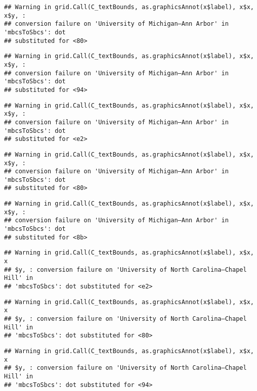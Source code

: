 \documentclass[]{article}
\begin{document}
\begin{verbatim}
## Warning in grid.Call(C_textBounds, as.graphicsAnnot(x$label), x$x, x$y, :
## conversion failure on 'University of Michigan—​Ann Arbor' in 'mbcsToSbcs': dot
## substituted for <80>
\end{verbatim}

\begin{verbatim}
## Warning in grid.Call(C_textBounds, as.graphicsAnnot(x$label), x$x, x$y, :
## conversion failure on 'University of Michigan—​Ann Arbor' in 'mbcsToSbcs': dot
## substituted for <94>
\end{verbatim}

\begin{verbatim}
## Warning in grid.Call(C_textBounds, as.graphicsAnnot(x$label), x$x, x$y, :
## conversion failure on 'University of Michigan—​Ann Arbor' in 'mbcsToSbcs': dot
## substituted for <e2>
\end{verbatim}

\begin{verbatim}
## Warning in grid.Call(C_textBounds, as.graphicsAnnot(x$label), x$x, x$y, :
## conversion failure on 'University of Michigan—​Ann Arbor' in 'mbcsToSbcs': dot
## substituted for <80>
\end{verbatim}

\begin{verbatim}
## Warning in grid.Call(C_textBounds, as.graphicsAnnot(x$label), x$x, x$y, :
## conversion failure on 'University of Michigan—​Ann Arbor' in 'mbcsToSbcs': dot
## substituted for <8b>
\end{verbatim}

\begin{verbatim}
## Warning in grid.Call(C_textBounds, as.graphicsAnnot(x$label), x$x, x
## $y, : conversion failure on 'University of North Carolina—​Chapel Hill' in
## 'mbcsToSbcs': dot substituted for <e2>
\end{verbatim}

\begin{verbatim}
## Warning in grid.Call(C_textBounds, as.graphicsAnnot(x$label), x$x, x
## $y, : conversion failure on 'University of North Carolina—​Chapel Hill' in
## 'mbcsToSbcs': dot substituted for <80>
\end{verbatim}

\begin{verbatim}
## Warning in grid.Call(C_textBounds, as.graphicsAnnot(x$label), x$x, x
## $y, : conversion failure on 'University of North Carolina—​Chapel Hill' in
## 'mbcsToSbcs': dot substituted for <94>
\end{verbatim}
\end{document}
